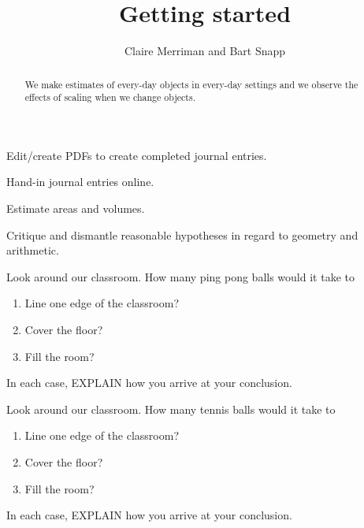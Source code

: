 \documentclass[handout,noauthor,nooutcomes,hints]{ximera}
\title{Getting started}
\author{Claire Merriman and Bart Snapp}
\begin{document}
\begin{abstract}
  We make estimates of every-day objects in every-day settings and we
  observe the effects of scaling when we change objects.
\end{abstract}
\maketitle



\begin{listOutcomes}
\item{Edit/create PDFs to create completed journal entries.}
\item{Hand-in journal entries online.}
\item{Estimate areas and volumes.}
\item{Critique and dismantle reasonable hypotheses in regard to geometry and arithmetic.}
\end{listOutcomes}

\mynewpage

\begin{question}
Look around our classroom. How many ping pong balls would it take to
\begin{enumerate}
\item Line one edge of the classroom?
\item Cover the floor?
\item Fill the room?
\end{enumerate}
In each case, EXPLAIN how you arrive at your conclusion.



\end{question}
\mynewpage

\begin{question}
Look around our classroom. How many tennis balls would it take to
\begin{enumerate}
\item Line one edge of the classroom?
 \item Cover the floor?
 \item Fill the room?
\end{enumerate}
In each case, EXPLAIN how you arrive at your conclusion.
\end{question}
\end{document}
